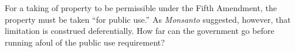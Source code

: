 
For a taking of property to be permissible under the Fifth Amendment, the
property must be taken ``for public use.'' As \emph{Monsanto} suggested,
however, that limitation is construed deferentially. How far can the government
go before running afoul of the public use requirement?

